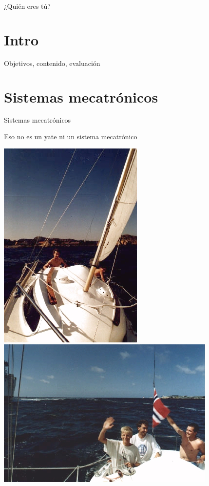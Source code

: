 \documentclass[presentation,aspectratio=169]{beamer}
\begin{document}
\begin{frame}[label={sec:orgdcd4c66}]{¿Quién eres tú?}
\end{frame}


\section{Intro}
\label{sec:org5e393b7}
\begin{frame}[label={sec:orgc57501e}]{Objetivos, contenido, evaluación}
\end{frame}


\section{Sistemas mecatrónicos}
\label{sec:orgf14e70c}

\begin{frame}[label={sec:orgb79af90}]{Sistemas mecatrónicos}
\end{frame}

\begin{frame}[label={sec:org7ff5547}]{Eso \alert{no} es un yate \alert{ni} un sistema mecatrónico}
\begin{center}
\includegraphics[height=0.6\textheight]{../../figures/red-heat-1.jpeg}
\includegraphics[height=0.6\textheight]{../../figures/red-heat-2.jpeg}
\end{center}
\end{frame}
\end{document}
